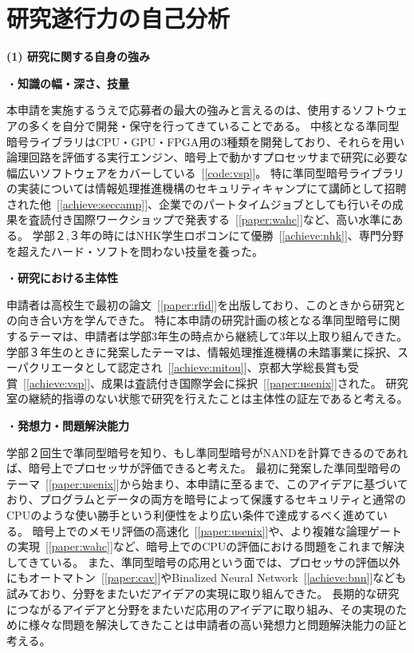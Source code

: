 
\section{研究遂行力の自己分析}

\noindent\textbf{(1) 研究に関する自身の強み}

\noindent・\textbf{知識の幅・深さ、技量}

本申請を実施するうえで応募者の最大の強みと言えるのは、使用するソフトウェアの多くを自分で開発・保守を行ってきていることである。
中核となる準同型暗号ライブラリはCPU・GPU・FPGA用の3種類を開発しており、それらを用い論理回路を評価する実行エンジン、暗号上で動かすプロセッサまで研究に必要な幅広いソフトウェアをカバーしている~[\ref{code:vsp}]。
特に準同型暗号ライブラリの実装については情報処理推進機構のセキュリティキャンプにて講師として招聘された他~[\ref{achieve:seccamp}]、企業でのパートタイムジョブとしても行いその成果を査読付き国際ワークショップで発表する~[\ref{paper:wahc}]など、高い水準にある。
学部２,３年の時にはNHK学生ロボコンにて優勝~[\ref{achieve:nhk}]、専門分野を超えたハード・ソフトを問わない技量を養った。

\noindent・\textbf{研究における主体性}

申請者は高校生で最初の論文~[\ref{paper:rfid}]を出版しており、このときから研究との向き合い方を学んできた。
特に本申請の研究計画の核となる準同型暗号に関するテーマは、申請者は学部3年生の時点から継続して3年以上取り組んできた。
学部３年生のときに発案したテーマは、情報処理推進機構の未踏事業に採択、スーパクリエータとして認定され~[\ref{achieve:mitou}]、京都大学総長賞も受賞~[\ref{achieve:vsp}]、成果は査読付き国際学会に採択~[\ref{paper:usenix}]された。
研究室の継続的指導のない状態で研究を行えたことは主体性の証左であると考える。

\noindent・\textbf{発想力・問題解決能力}

学部２回生で準同型暗号を知り、もし準同型暗号がNANDを計算できるのであれば、暗号上でプロセッサが評価できると考えた。
最初に発案した準同型暗号のテーマ~[\ref{paper:usenix}]から始まり、本申請に至るまで、このアイデアに基づいており、プログラムとデータの両方を暗号によって保護するセキュリティと通常のCPUのような使い勝手という利便性をより広い条件で達成するべく進めている。
暗号上でのメモリ評価の高速化~[\ref{paper:usenix}]や、より複雑な論理ゲートの実現~[\ref{paper:wahc}]など、暗号上でのCPUの評価における問題をこれまで解決してきている。
また、準同型暗号の応用という面では、プロセッサの評価以外にもオートマトン~[\ref{paper:cav}]やBinalized Neural Network~[\ref{achieve:bnn}]なども試みており、分野をまたいだアイデアの実現に取り組んできた。
長期的な研究につながるアイデアと分野をまたいだ応用のアイデアに取り組み、その実現のために様々な問題を解決してきたことは申請者の高い発想力と問題解決能力の証と考える。


